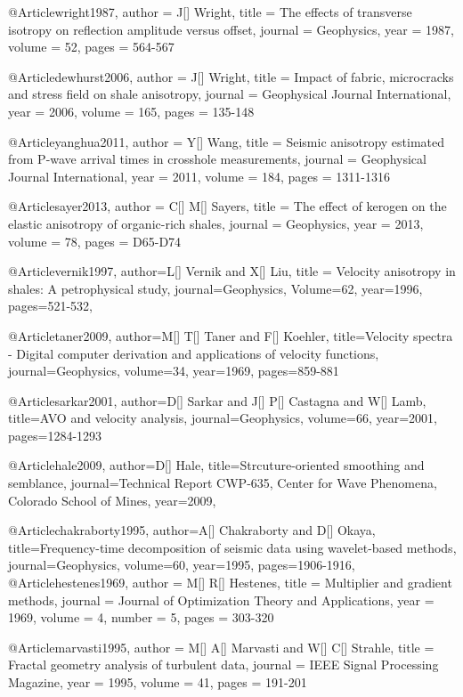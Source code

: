 @Article{wright1987,
  author = 	 {J[] Wright},
  title = 	 {The effects of transverse isotropy on reflection amplitude versus offset},
  journal = 	 {Geophysics},
  year = 	 1987,
  volume =	 52,
  pages =	 {564-567}
}

@Article{dewhurst2006,
  author = 	 {J[] Wright},
  title = 	 {Impact of fabric, microcracks and stress field on shale anisotropy},
  journal = 	 {Geophysical Journal International},
  year = 	 2006,
  volume =	 165,
  pages =	 {135-148}
}

@Article{yanghua2011,
  author = 	 {Y[] Wang},
  title = 	 {Seismic anisotropy estimated from P-wave arrival times in crosshole measurements},
  journal = 	 {Geophysical Journal International},
  year = 	 2011,
  volume =	 184,
  pages =	 {1311-1316}
}

@Article{sayer2013,
  author = 	 {C[] M[] Sayers},
  title = 	 {The effect of kerogen on the elastic anisotropy of
organic-rich shales},
  journal = 	 {Geophysics},
  year = 	 2013,
  volume =	 78,
  pages =	 {D65-D74}
}

@Article{vernik1997,
  author={L[] Vernik and X[] Liu},
  title = {Velocity anisotropy in shales: A petrophysical study},
  journal={Geophysics},
  Volume=62,
  year=1996,
  pages={521-532},
}


@Article{taner2009,
author={M[] T[] Taner and F[] Koehler},
title={Velocity spectra - Digital computer derivation and applications of velocity functions},
journal={Geophysics},
volume=34,
year=1969,
pages={859-881}
}

@Article{sarkar2001,
author={D[] Sarkar and J[] P[] Castagna and W[] Lamb},
title={AVO and velocity analysis},
journal={Geophysics},
volume=66,
year=2001,
pages={1284-1293}
}

@Article{hale2009,
author={D[] Hale},
title={Strcuture-oriented smoothing and semblance},
journal={Technical Report CWP-635, Center for Wave Phenomena, Colorado School of Mines},
year=2009,
}


@Article{chakraborty1995,
author={A[] Chakraborty and D[] Okaya},
title={Frequency-time decomposition of
seismic data using wavelet-based methods},
journal={Geophysics},
volume=60,
year=1995,
pages={1906-1916},
}
@Article{hestenes1969,
  author = 	 {M[] R[] Hestenes},
  title = 	 {Multiplier and gradient methods},
  journal = 	 {Journal of Optimization Theory and Applications},
  year = 	 1969,
  volume = 	 4,
  number = 5,
  pages = 	 {303-320}
}

@Article{marvasti1995,
  author = 	 {M[] A[] Marvasti and W[] C[] Strahle},
  title = 	 {Fractal geometry analysis of turbulent data},
  journal = 	 {IEEE Signal Processing Magazine},
  year = 	 1995,
  volume = 	 41,
  pages = 	 {191-201}
}

